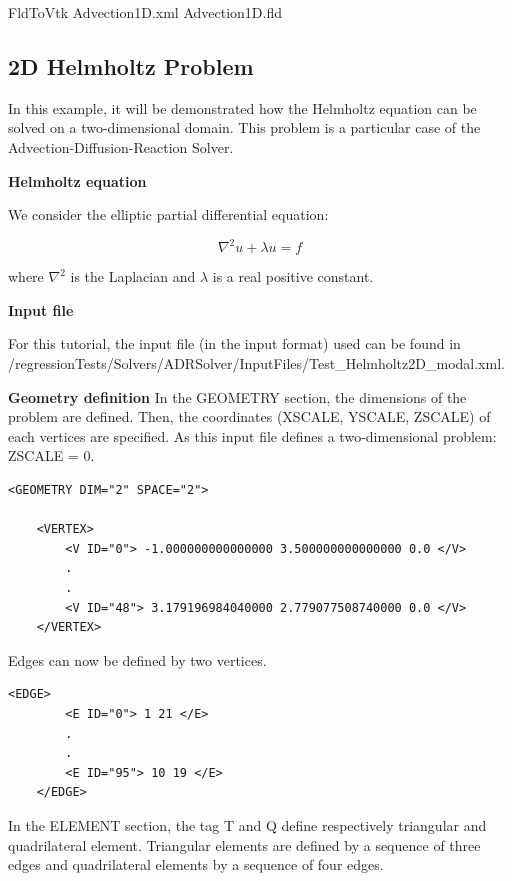 FldToVtk Advection1D.xml Advection1D.fld

\subsection{2D Helmholtz Problem}

In this example, it will be demonstrated how the Helmholtz equation can be solved on a two-dimensional domain. 
This problem is a particular case of the Advection-Diffusion-Reaction Solver.

\textbf{Helmholtz equation}

We consider the elliptic partial differential equation:

\begin{equation}
\nabla^2 u  + \lambda u =  f
\end{equation}

where $\nabla^2$ is the Laplacian and $\lambda$ is a real positive constant.

\textbf{Input file} 

For this tutorial, the input file (in the \nekpp input format) used can be found
 in  \nekpp/regressionTests/Solvers/ADRSolver/InputFiles/Test\_Helmholtz2D\_modal.xml.

\textbf{\footnotesize{Geometry definition}}
In the GEOMETRY section, the dimensions of the problem are defined. 
Then, the coordinates (XSCALE, YSCALE, ZSCALE) of each vertices are specified. As this input file defines a two-dimensional problem: ZSCALE = 0.

\begin{lstlisting}[style=XMLStyle]
<GEOMETRY DIM="2" SPACE="2">

    <VERTEX>
        <V ID="0"> -1.000000000000000 3.500000000000000 0.0 </V>
        .
        .
        <V ID="48"> 3.179196984040000 2.779077508740000 0.0 </V>
    </VERTEX>
\end{lstlisting}

Edges can now be defined by two vertices.

\begin{lstlisting}[style=XMLStyle]
 <EDGE>
        <E ID="0"> 1 21 </E>
        .
        .
        <E ID="95"> 10 19 </E>
    </EDGE>
\end{lstlisting}

In the ELEMENT section, the tag T and Q define respectively triangular and quadrilateral element.
 Triangular elements are defined by a sequence of three edges and quadrilateral elements by a sequence of four edges.

